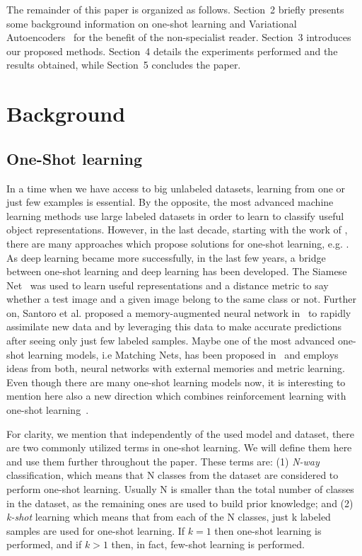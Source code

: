 \documentclass[sigconf,authorversion=true]{aamas}  %
\begin{document}
The remainder of this paper is organized as follows. Section~2 briefly presents some background information on one-shot learning and Variational Autoencoders~\cite{Kingma2013} for the benefit of the non-specialist reader. Section~3 introduces our proposed methods. Section~4 details the experiments performed and the results obtained, while Section~5 concludes the paper.

\section{Background}\subsection{One-Shot learning}
In a time when we have access to big unlabeled datasets, learning from one or just few examples is essential. By the opposite, the most advanced machine learning methods use large labeled datasets in order to learn to classify useful object representations. However, in the last decade, starting with the work of \cite{FeiFei2006}, there are many approaches which propose solutions for one-shot learning, e.g. \cite{MillerCVPR2000,LakeScience2015,Koch2015SiameseNN,HariharanG16,VinyalsBLKW16}.
As deep learning became more successfully, in the last few years, a bridge between one-shot learning and deep learning has been developed. The Siamese Net~\cite{Koch2015SiameseNN} was used to learn useful representations and a distance metric to say whether a test image and a given image belong to the same class or not.
Further on, Santoro et al. proposed a memory-augmented neural network in~\cite{SantoroBBWL16} to rapidly assimilate new data and by leveraging  this  data  to  make  accurate  predictions after seeing only just few  labeled samples. Maybe one of the most advanced one-shot learning models, i.e Matching Nets, has been proposed in~\cite{VinyalsBLKW16} and employs ideas from both, neural networks with external memories and metric learning. Even though there are many one-shot learning models now, it is interesting to mention here also a new direction which combines reinforcement learning with one-shot learning~\cite{WoodwardF17}.


For clarity, we mention that independently of the used model and dataset, there are two commonly utilized terms in one-shot learning. We will define them here and use them further throughout the paper. These terms are: (1) \textit{N-way} classification, which means that N classes from the dataset are considered to perform one-shot learning. Usually N is smaller than the total number of classes in the dataset, as the remaining ones are used to build prior knowledge; and (2) \textit{k-shot} learning which means that from each of the N classes, just k labeled samples are used for one-shot learning. If $k=1$ then one-shot learning is performed, and if $k>1$ then, in fact,  few-shot learning is performed.
\end{document}
